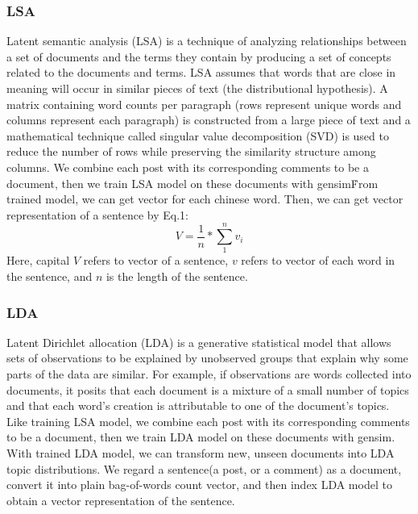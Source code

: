 \documentclass{llncs}
\begin{document}
\subsubsection{LSA}
Latent semantic analysis (LSA) is a technique of analyzing relationships between a set of documents and the terms they contain by producing a set of concepts related to the documents and terms. LSA assumes that words that are close in meaning will occur in similar pieces of text (the distributional hypothesis). A matrix containing word counts per paragraph (rows represent unique words and columns represent each paragraph) is constructed from a large piece of text and a mathematical technique called singular value decomposition (SVD) is used to reduce the number of rows while preserving the similarity structure among columns.\cite{Susan} We combine each post with its corresponding comments to be a document, then we train LSA model on these documents with gensim\footnotemark\. From trained model, we can get vector for each chinese word.
Then, we can get vector representation of a sentence by Eq.1:
\begin{equation}
   V = \frac{1}{n} * \sum_1^n v_i 
\end{equation}
Here, capital $V$ refers to vector of a sentence, $v$ refers to vector of each word in the sentence, and $n$ is the length of the sentence.


\subsubsection{LDA}
Latent Dirichlet allocation (LDA) is a generative statistical model that allows sets of observations to be explained by unobserved groups that explain why some parts of the data are similar. For example, if observations are words collected into documents, it posits that each document is a mixture of a small number of topics and that each word's creation is attributable to one of the document's topics.\cite{David} Like training LSA model, we combine each post with its corresponding comments to be a document, then we train LDA model on these documents with gensim. With trained LDA model, we can transform new, unseen documents into LDA topic distributions. We regard a sentence(a post, or a comment) as a document, convert it into plain bag-of-words count vector, and then index LDA model to obtain a vector representation of the sentence. 
\end{document}
